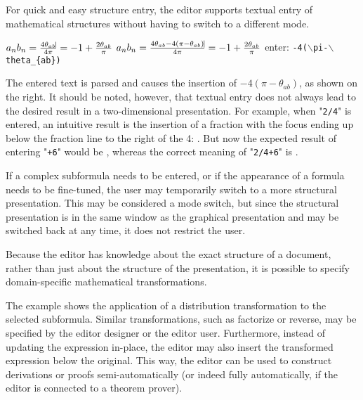 
For quick and easy structure entry, the editor supports textual entry of mathematical structures without having to switch to a different mode.

\editScreenshot
{$a_nb_n = \frac{4\theta_{ab}\vline}{4\pi } = -1 + \frac{2\theta_{ab}}{\pi}$}
{$a_nb_n = \frac{4\theta_{ab} - 4(\pi - \theta_{ab})\vline}{4\pi } = -1 + \frac{2\theta_{ab}}{\pi}$}
{enter:  {\tt -4($\backslash$pi-$\backslash$theta\_\{ab\})}}{}

The entered text is parsed and causes the insertion of $- 4(\pi - \theta_{ab})$, as shown on the right.  It should be noted, however, that textual entry does not always lead to the desired result in a two-dimensional presentation. For example, when "\verb|2/4|" is entered, an intuitive result is the insertion of a fraction with the focus ending up below the fraction line to the right of the 4: . But now the expected result of entering "\verb|+6|" would be , whereas the correct meaning of "\verb|2/4+6|" is .

If a complex subformula needs to be entered, or if the appearance of a formula needs to be fine-tuned, the user may temporarily switch to a more structural presentation. This may be considered a mode switch, but since the structural presentation is in the same window as the graphical presentation and may be switched back at any time, it does not restrict the user.


Because the editor has knowledge about the exact structure of a document, rather than just about the structure of the presentation, it is possible to specify domain-specific mathematical transformations.


The example shows the application of a distribution transformation to the selected subformula. Similar transformations, such as factorize or reverse, may be specified by the editor designer or the editor user. Furthermore, instead of updating the expression in-place, the editor may also insert the transformed expression below the original. This way, the editor can be used to construct derivations or proofs semi-automatically (or indeed fully automatically, if the editor is connected to a theorem prover).

